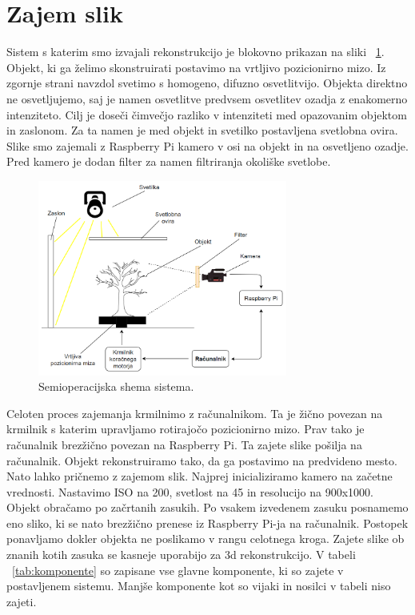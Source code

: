 \documentclass[journal,a4paper,twoside]{sty/IEEEtran}
\begin{document}
\section{Zajem slik}
Sistem s katerim smo izvajali rekonstrukcijo je blokovno prikazan na sliki ~\ref{fig:blokovna}. Objekt, ki ga želimo skonstruirati postavimo na vrtljivo pozicionirno mizo. Iz zgornje strani navzdol svetimo s homogeno, difuzno osvetlitvijo. Objekta direktno ne osvetljujemo, saj je namen osvetlitve predvsem osvetlitev ozadja z enakomerno intenziteto. Cilj je doseči čimvečjo razliko v intenziteti med opazovanim objektom in zaslonom. Za ta namen je med objekt in svetilko postavljena svetlobna ovira. Slike smo zajemali z Raspberry Pi kamero v osi na objekt in na osvetljeno ozadje. Pred kamero je dodan filter za namen filtriranja okoliške svetlobe.

\begin{figure}[H]
	\centerline{\includegraphics[width=8.2cm]{fig/blokovna_sistem}}
	\caption{Semioperacijska shema sistema.}
	\label{fig:blokovna}
\end{figure}
%
 Celoten proces zajemanja krmilnimo z računalnikom. Ta je žično povezan na krmilnik s katerim upravljamo rotirajočo pozicionirno mizo. Prav tako je računalnik brezžično povezan na Raspberry Pi. Ta zajete slike pošilja na računalnik. Objekt rekonstruiramo tako, da ga postavimo na predvideno mesto. Nato lahko pričnemo z zajemom slik. Najprej inicializiramo kamero na začetne vrednosti. Nastavimo ISO na 200, svetlost na 45 in resolucijo na 900x1000.  Objekt obračamo po začrtanih zasukih. Po vsakem izvedenem zasuku posnamemo eno sliko, ki se nato brezžično prenese iz Raspberry Pi-ja na računalnik. Postopek ponavljamo dokler objekta ne poslikamo v rangu celotnega kroga. Zajete slike ob znanih kotih zasuka se kasneje uporabijo za 3d rekonstrukcijo. V tabeli ~\ref{tab:komponente} so zapisane vse glavne komponente, ki so zajete v postavljenem sistemu. Manjše komponente kot so vijaki in nosilci v tabeli niso zajeti.
\end{document}
